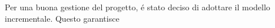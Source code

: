 Per una buona gestione del progetto, \'e stato deciso di adottare il modello
incrementale. Questo garantisce